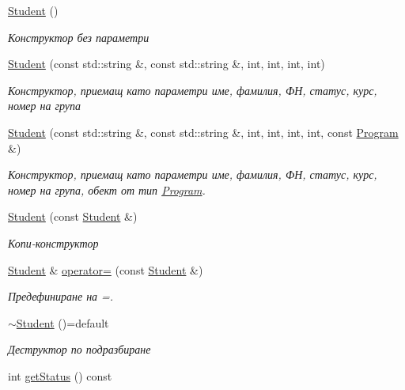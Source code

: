\begin{DoxyCompactItemize}
\item 
\hyperlink{class_student_af9168cedbfa5565cf0b20c1a9d3f5c9d}{Student} ()
\begin{DoxyCompactList}\small\item\em Конструктор без параметри \end{DoxyCompactList}\item 
\hyperlink{class_student_a65d6b3a714d5c60e8c9ffbc6d64f1a69}{Student} (const std\+::string \&, const std\+::string \&, int, int, int, int)
\begin{DoxyCompactList}\small\item\em Конструктор, приемащ като параметри име, фамилия, ФН, статус, курс, номер на група \end{DoxyCompactList}\item 
\hyperlink{class_student_a5c162823e7c932ba957b58215ee969c1}{Student} (const std\+::string \&, const std\+::string \&, int, int, int, int, const \hyperlink{class_program}{Program} \&)
\begin{DoxyCompactList}\small\item\em Конструктор, приемащ като параметри име, фамилия, ФН, статус, курс, номер на група, обект от тип \hyperlink{class_program}{Program}. \end{DoxyCompactList}\item 
\hyperlink{class_student_a4bc8fcbadabef3f7b81c40536f3713b1}{Student} (const \hyperlink{class_student}{Student} \&)
\begin{DoxyCompactList}\small\item\em Копи-\/конструктор \end{DoxyCompactList}\item 
\hyperlink{class_student}{Student} \& \hyperlink{class_student_aea411d7956cc1712b7d0e15eb7ed0832}{operator=} (const \hyperlink{class_student}{Student} \&)
\begin{DoxyCompactList}\small\item\em Предефиниране на =. \end{DoxyCompactList}\item 
\hyperlink{class_student_a92d33a757275b7a237910e974cd8bd0f}{$\sim$\+Student} ()=default
\begin{DoxyCompactList}\small\item\em Деструктор по подразбиране \end{DoxyCompactList}\item 
int \hyperlink{class_student_a21b27deb99516d176ba91139227662b8}{get\+Status} () const

\end{DoxyCompactItemize}
